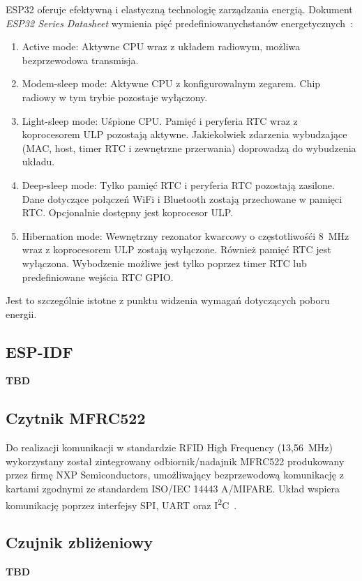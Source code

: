             ESP32 oferuje efektywną i elastyczną technologię zarządzania energią. Dokument \textit{ESP32 Series Datasheet} wymienia pięć predefiniowanychstanów energetycznych~\cite{esp32-ds}:
            \begin{enumerate}
                \item Active mode: Aktywne CPU wraz z układem radiowym, możliwa bezprzewodowa transmisja.
                \item Modem-sleep mode: Aktywne CPU z konfigurowalnym zegarem. Chip radiowy w tym trybie pozostaje wyłączony.
                \item Light-sleep mode: Uśpione CPU. Pamięć i peryferia RTC wraz z koprocesorem ULP pozostają aktywne. Jakiekolwiek zdarzenia wybudzające (MAC, host, timer RTC i zewnętrzne przerwania) doprowadzą do wybudzenia układu.
                \item Deep-sleep mode: Tylko pamięć RTC i peryferia RTC pozostają zasilone. Dane dotyczące połączeń WiFi i Bluetooth zostają przechowane w pamięci RTC. Opcjonalnie dostępny jest koprocesor ULP.
                \item Hibernation mode: Wewnętrzny rezonator kwarcowy o częstotliwośći 8~MHz wraz z koprocesorem ULP zostają wyłączone. Również pamięć RTC jest wyłączona. Wybodzenie możliwe jest tylko poprzez timer RTC lub predefiniowane wejścia RTC GPIO.
            \end{enumerate}
            Jest to szczególnie istotne z punktu widzenia wymagań dotyczących poboru energii.

        \subsection{ESP-IDF}
            \textbf{TBD}

        \subsection{Czytnik MFRC522}

            Do realizacji komunikacji w standardzie RFID High Frequency (13,56~MHz) wykorzystany został zintegrowany odbiornik/nadajnik MFRC522 produkowany przez firmę NXP Semiconductors, umożliwający bezprzewodową komunikację z kartami zgodnymi ze standardem ISO/IEC 14443 A/MIFARE. Układ wspiera komunikację poprzez interfejsy SPI, UART oraz I\textsuperscript{2}C~\cite{mfrc522-ds}.

        \subsection{Czujnik zbliżeniowy}
            \textbf{TBD}


